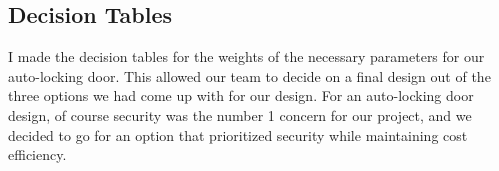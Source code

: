 \subsection{Decision Tables}
    I made the decision tables for the weights of the necessary parameters for our auto-locking door. This allowed our team to decide on a final design out of the three options we had come up with for our design. For an auto-locking door design, of course security was the number 1 concern for our project, and we decided to go for an option that prioritized security while maintaining cost efficiency.
